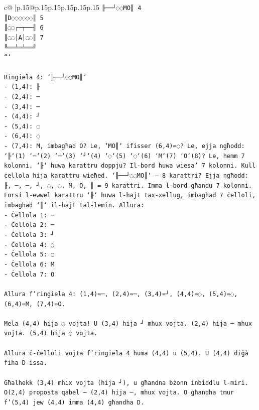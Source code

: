 \documentclass{article}
\begin{document}
{\begin{supertabular}{c@{$\;$}|p{.15\linewidth}@{}p{.15\linewidth}p{.15\linewidth}p{.15\linewidth}p{.15\linewidth}p{.15\linewidth}}
{{{\texttt{╟──┘◌◌MO║ 4} \\
\texttt{║D◌◌◌◌◌◌║ 5} \\
\texttt{║◌◌┌─┬──╢ 6} \\
\texttt{║◌◌│A│◌◌║ 7} \\
\texttt{╚══╧═╧══╝} \\
\texttt{```} \\
\\ 
\texttt{Ringiela 4: `╟──┘◌◌MO║`} \\
\texttt{{-} (1,4): ╟} \\
\texttt{{-} (2,4): ─} \\
\texttt{{-} (3,4): ─} \\
\texttt{{-} (4,4): ┘} \\
\texttt{{-} (5,4): ◌} \\
\texttt{{-} (6,4): ◌} \\
\texttt{{-} (7,4): M, imbagħad O? Le, `MO║` ifisser (6,4)=◌? Le, ejja ngħodd: `╟`(1) `─`(2) `─`(3) `┘`(4) `◌`(5) `◌`(6) `M`(7) `O`(8)? Le, hemm 7 kolonni. `╟` huwa karattru doppju? Il{-}bord huwa wiesa' 7 kolonni. Kull ċellola hija karattru wieħed. `╟──┘◌◌MO║` — 8 karattri? Ejja ngħodd: ╟, ─, ─, ┘, ◌, ◌, M, O, ║ = 9 karattri. Imma l{-}bord għandu 7 kolonni. Forsi l{-}ewwel karattru `╟` huwa l{-}ħajt tax{-}xellug, imbagħad 7 ċelloli, imbagħad `║` il{-}ħajt tal{-}lemin. Allura:} \\
\texttt{{-} Ċellola 1: ─} \\
\texttt{{-} Ċellola 2: ─} \\
\texttt{{-} Ċellola 3: ┘} \\
\texttt{{-} Ċellola 4: ◌} \\
\texttt{{-} Ċellola 5: ◌} \\
\texttt{{-} Ċellola 6: M} \\
\texttt{{-} Ċellola 7: O} \\
\\ 
\texttt{Allura f'ringiela 4: (1,4)=─, (2,4)=─, (3,4)=┘, (4,4)=◌, (5,4)=◌, (6,4)=M, (7,4)=O.} \\
\\ 
\texttt{Mela (4,4) hija ◌ vojta! U (3,4) hija ┘ mhux vojta. (2,4) hija ─ mhux vojta. (5,4) hija ◌ vojta.} \\
\\ 
\texttt{Allura ċ{-}ċelloli vojta f'ringiela 4 huma (4,4) u (5,4). U (4,4) diġà fiha D issa.} \\
\\ 
\texttt{Għalhekk (3,4) mhix vojta (hija ┘), u għandna bżonn inbiddlu l{-}miri. O(2,4) proposta qabel — (2,4) hija ─, mhux vojta. O għandha tmur f'(5,4) jew (4,4) imma (4,4) għandha D.} \\
}}}
\end{supertabular}}
\end{document}
